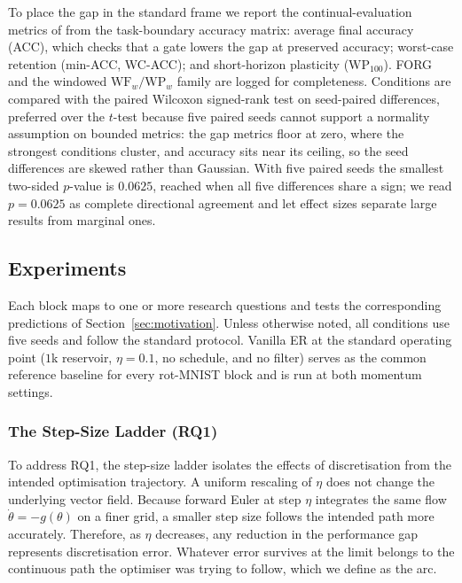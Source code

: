 To place the gap in the standard frame we report the continual-evaluation metrics of \citet{delange2023continualevaluationlifelonglearning} from the task-boundary accuracy matrix: average final accuracy (ACC), which checks that a gate lowers the gap at preserved accuracy; worst-case retention (min-ACC, WC-ACC); and short-horizon plasticity ($\mathrm{WP}_{100}$). FORG and the windowed $\mathrm{WF}_w/\mathrm{WP}_w$ family are logged for completeness. Conditions are compared with the paired Wilcoxon signed-rank test on seed-paired differences, preferred over the $t$-test because five paired seeds cannot support a normality assumption on bounded metrics: the gap metrics floor at zero, where the strongest conditions cluster, and accuracy sits near its ceiling, so the seed differences are skewed rather than Gaussian. With five paired seeds the smallest two-sided $p$-value is $0.0625$, reached when all five differences share a sign; we read $p = 0.0625$ as complete directional agreement and let effect sizes separate large results from marginal ones.

\subsection{Experiments}
\label{subsec:overview}

Each block maps to one or more research questions and tests the corresponding predictions of Section~\ref{sec:motivation}. Unless otherwise noted, all conditions use five seeds and follow the standard protocol. Vanilla ER at the standard operating point ($1$k reservoir, $\eta = 0.1$, no schedule, and no filter) serves as the common reference baseline for every rot-MNIST block and is run at both momentum settings.

\subsubsection{The Step-Size Ladder (RQ1)}
\label{subsec:ladder}

To address RQ1, the step-size ladder isolates the effects of discretisation from the intended optimisation trajectory. A uniform rescaling of $\eta$ does not change the underlying vector field. Because forward Euler at step $\eta$ integrates the same flow $\dot\theta = -g(\theta)$ on a finer grid, a smaller step size follows the intended path more accurately. Therefore, as $\eta$ decreases, any reduction in the performance gap represents discretisation error. Whatever error survives at the limit belongs to the continuous path the optimiser was trying to follow, which we define as the arc.

